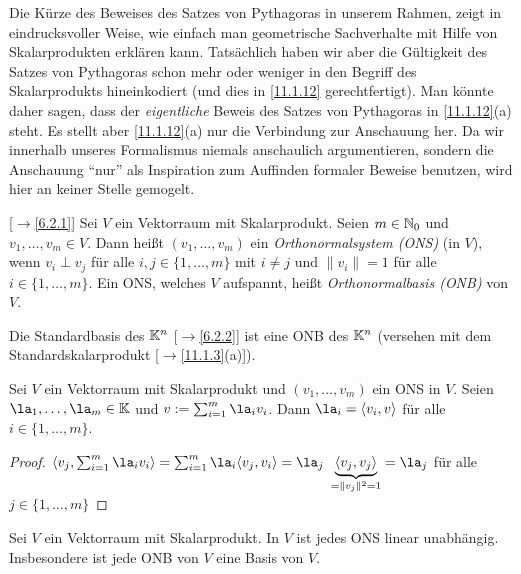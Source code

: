 \documentclass[../../main.tex]{subfiles}
\begin{document}
\begin{bem}\label{11.2.4} Die Kürze des Beweises des Satzes von Pythagoras in unserem Rahmen, zeigt in eindrucksvoller Weise,
wie einfach man geometrische Sachverhalte mit Hilfe von Skalarprodukten erklären kann. 
Tatsächlich haben wir aber die Gültigkeit des Satzes von Pythagoras schon mehr oder weniger in den Begriff des Skalarprodukts hineinkodiert (und dies in  \ref{11.1.12}
gerechtfertigt). Man könnte daher sagen, dass der \emph{eigentliche} Beweis des Satzes von Pythagoras in \ref{11.1.12}(a) steht. Es stellt aber \ref{11.1.12}(a) nur die Verbindung zur
Anschauung her. Da wir innerhalb unseres Formalismus niemals anschaulich argumentieren, sondern die Anschauung "`nur"' als Inspiration zum Auffinden formaler Beweise
benutzen, wird hier an keiner Stelle gemogelt. 
\end{bem}

\begin{df}\label{11.2.5}\mbox{}[$\to$\ref{6.2.1}]
Sei $V$ ein Vektorraum mit Skalarprodukt. Seien $m\in\mathbb N_0$ und $v_1,\dots,v_m\in V$. Dann heißt $(v_1,\dots,v_m)$ ein \emph{Orthonormalsystem (ONS)} (in $V$), wenn
$v_i\perp v_j$ für alle $i,j\in\{1,\dots,m\}$ mit $i\ne j$ und $\|v_i\|=1$ für alle $i\in\{1,\dots,m\}$. Ein ONS, welches $V$ aufspannt, heißt \emph{Orthonormalbasis (ONB)} von $V$.
\end{df}

\begin{bsp}\label{11.2.6}
Die Standardbasis des $\mathbb K^n$ [$\to$\ref{6.2.2}] ist eine ONB des $\mathbb K^n$ (versehen mit dem Standardskalarprodukt [$\to$\ref{11.1.3}(a)]).
\end{bsp}

\begin{pro}\label{11.2.7}
Sei $V$ ein Vektorraum mit Skalarprodukt und $(v_1,\dots,v_m)$ ein ONS in $V$. Seien $\la_1,\dots,\la_m\in\K$ und $v:=\sum_{i=1}^m\la_iv_i$. Dann
$\la_i=\langle v_i,v\rangle$ für alle $i\in\{1,\dots,m\}$.
\end{pro}

\begin{proof}
$\langle v_j,\sum_{i=1}^m\la_iv_i\rangle=\sum_{i=1}^m\la_i\langle v_j,v_i\rangle=\la_j\
\underbrace{\langle v_j,v_j\rangle}_{=\|v_j\|^2=1}=\la_j$ für alle $j\in\{1,\dots,m\}$
\end{proof}

\begin{kor}\label{11.2.8}
Sei $V$ ein Vektorraum mit Skalarprodukt. In $V$ ist jedes ONS linear unabhängig. Insbesondere ist jede ONB von $V$ eine Basis von $V$.
\end{kor}
\end{document}

